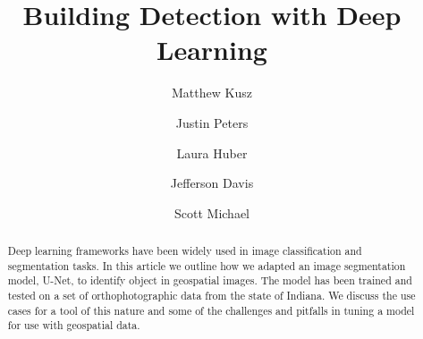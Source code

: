 \documentclass[acmtog, authorversion]{acmart}
\begin{document}
\title{Building Detection with Deep Learning}


\author{Matthew Kusz}

\author{Justin Peters}

\author{Laura Huber}

\author{Jefferson Davis}

\author{Scott Michael}

\renewcommand{\shortauthors}{Kusz and Peters, et al.}

\newif\ifdraft
\drafttrue
\ifdraft
\newcommand{\note}[1]{ {\textcolor{blue} { ***NOTE: #1 }}}
\newcommand{\scott}[1]{ {\textcolor{red} { ***Scott: #1 }}}
\newcommand{\justin}[1]{ {\textcolor{green} {***Justin: #1}}}
\newcommand{\laura}[1]{ {\textcolor{orange} { ***Laura: #1 }}}
\else
\newcommand{\note}[1]{ {}}
\newcommand{\scott}[1]{ {}}
\newcommand{\justin}[1]{ {}}
\newcommand{\laura}[1]{ {}}
\fi

\begin{abstract}
Deep learning frameworks have been widely used in image classification and segmentation tasks. In this article we outline how we adapted an image segmentation model, U-Net, to identify object in geospatial images. The model has been trained and tested on a set of orthophotographic data from the state of Indiana. We discuss the use cases for a tool of this nature and some of the challenges and pitfalls in tuning a model for use with geospatial data.
\end{abstract}
\end{document}

